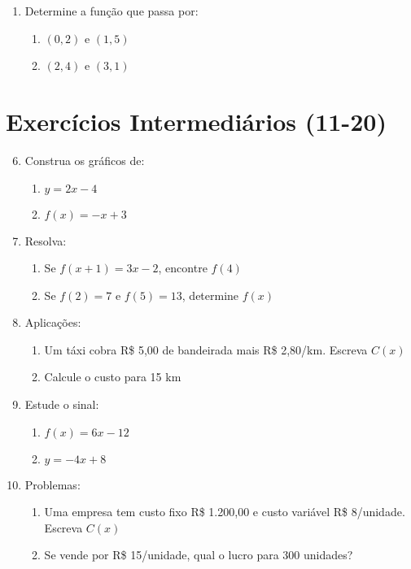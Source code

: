 \documentclass[11pt]{article}
\begin{document}
\begin{multicols}{2}
\begin{enumerate}
    \item Determine a função que passa por:
    \begin{enumerate}[label=\alph*)]
        \item \( (0,2) \) e \( (1,5) \)
        \item \( (2,4) \) e \( (3,1) \)
    \end{enumerate}
\end{enumerate}

\section*{Exercícios Intermediários (11-20)}
\begin{enumerate}\setcounter{enumi}{5}
    \item Construa os gráficos de:
    \begin{enumerate}[label=\alph*)]
        \item \( y = 2x - 4 \)
        \item \( f(x) = -x + 3 \)
    \end{enumerate}
    
    \item Resolva:
    \begin{enumerate}[label=\alph*)]
        \item Se \( f(x+1) = 3x - 2 \), encontre \( f(4) \)
        \item Se \( f(2) = 7 \) e \( f(5) = 13 \), determine \( f(x) \)
    \end{enumerate}
    
    \item Aplicações:
    \begin{enumerate}[label=\alph*)]
        \item Um táxi cobra R\$ 5,00 de bandeirada mais R\$ 2,80/km. Escreva \( C(x) \)
        \item Calcule o custo para 15 km
    \end{enumerate}
    
    \item Estude o sinal:
    \begin{enumerate}[label=\alph*)]
        \item \( f(x) = 6x - 12 \)
        \item \( y = -4x + 8 \)
    \end{enumerate}
    
    \item Problemas:
    \begin{enumerate}[label=\alph*)]
        \item Uma empresa tem custo fixo R\$ 1.200,00 e custo variável R\$ 8/unidade. Escreva \( C(x) \)
        \item Se vende por R\$ 15/unidade, qual o lucro para 300 unidades?
    \end{enumerate}
\end{enumerate}


\end{multicols}
\end{document}

